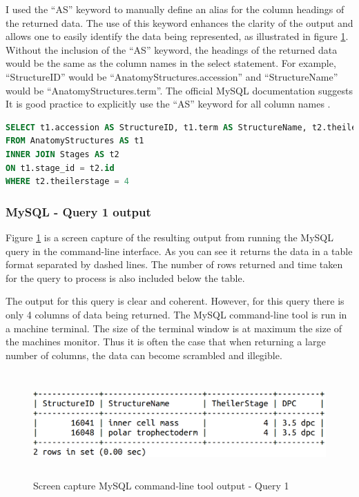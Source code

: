 I used the ``AS'' keyword to manually define an alias for the column headings of the returned data. The use of this keyword enhances the clarity of the output and allows one to easily identify the data being represented, as illustrated in figure \ref{fig:mysqlquery1}. Without the inclusion of the ``AS'' keyword, the headings of the returned data would be the same as the column names in the select statement. For example, ``StructureID'' would be ``AnatomyStructures.accession'' and ``StructureName'' would be ``AnatomyStructures.term''. The official MySQL documentation suggests It is good practice to explicitly use the ``AS'' keyword for all column names \cite{mysqlworkbench}.

\begin{lstlisting}[language=SQL, caption=MySQL query 1 statement. All structures at Theiler Stage X., label=code:mysqlquery1]
SELECT t1.accession AS StructureID, t1.term AS StructureName, t2.theilerstage AS TheilerStage, t2.dpc AS DPC
FROM AnatomyStructures AS t1
INNER JOIN Stages AS t2
ON t1.stage_id = t2.id
WHERE t2.theilerstage = 4
\end{lstlisting}

\subsubsection*{MySQL - Query 1 output}\label{mysqlquery1output}
Figure \ref{fig:mysqlquery1} is a screen capture of the resulting output from running the MySQL query in the command-line interface. As you can see it returns the data in a table format separated by dashed lines. The number of rows returned and time taken for the query to process is also included below the table.

The output for this query is clear and coherent. However, for this query there is only 4 columns of data being returned. The MySQL command-line tool is run in a machine terminal. The size of the terminal window is at maximum the size of the machines monitor. Thus it is often the case that when returning a large number of columns, the data can become scrambled and illegible.

\begin{figure}[H]\begin{center}\includegraphics[height=4cm,width=0.9\linewidth]{images/mysqlquery1}\caption{Screen capture MySQL command-line tool output - Query 1}\label{fig:mysqlquery1}\end{center}\end{figure}

